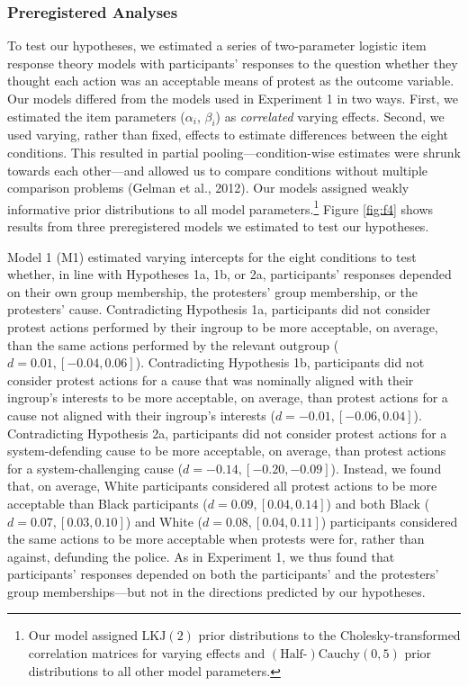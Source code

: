 \documentclass[twocolumn, 11pt, letterpaper]{article}
\begin{document}
\hypertarget{preregistered-analyses-1}{%
\subsubsection{Preregistered Analyses}\label{preregistered-analyses-1}}

To test our hypotheses, we estimated a series of two-parameter logistic
item response theory models with participants' responses to the question
whether they thought each action was an acceptable means of protest as
the outcome variable. Our models differed from the models used in
Experiment 1 in two ways. First, we estimated the item parameters
(\(\alpha_i\), \(\beta_i\)) as \emph{correlated} varying effects.
Second, we used varying, rather than fixed, effects to estimate
differences between the eight conditions. This resulted in partial
pooling---condition-wise estimates were shrunk towards each other---and
allowed us to compare conditions without multiple comparison problems
(Gelman et al., 2012). Our models assigned weakly informative prior
distributions to all model parameters.\footnote{Our model assigned
  \(\text{LKJ} (2)\) prior distributions to the Cholesky-transformed
  correlation matrices for varying effects and
  \((\text{Half-})\text{Cauchy} (0, 5)\) prior distributions to all
  other model parameters.} Figure \ref{fig:f4} shows results from three
preregistered models we estimated to test our hypotheses.

Model 1 (M1) estimated varying intercepts for the eight conditions to
test whether, in line with Hypotheses 1a, 1b, or 2a, participants'
responses depended on their own group membership, the protesters' group
membership, or the protesters' cause. Contradicting Hypothesis 1a,
participants did not consider protest actions performed by their ingroup
to be more acceptable, on average, than the same actions performed by
the relevant outgroup (\(d = 0.01, [-0.04, 0.06]\)). Contradicting
Hypothesis 1b, participants did not consider protest actions for a cause
that was nominally aligned with their ingroup's interests to be more
acceptable, on average, than protest actions for a cause not aligned
with their ingroup's interests (\(d = -0.01, [-0.06, 0.04]\)).
Contradicting Hypothesis 2a, participants did not consider protest
actions for a system-defending cause to be more acceptable, on average,
than protest actions for a system-challenging cause
(\(d = -0.14, [-0.20, -0.09]\)). Instead, we found that, on average,
White participants considered all protest actions to be more acceptable
than Black participants (\(d = 0.09, [0.04, 0.14]\)) and both Black
(\(d = 0.07, [0.03, 0.10]\)) and White (\(d = 0.08, [0.04, 0.11]\))
participants considered the same actions to be more acceptable when
protests were for, rather than against, defunding the police. As in
Experiment 1, we thus found that participants' responses depended on
both the participants' and the protesters' group memberships---but not
in the directions predicted by our hypotheses.
\end{document}
